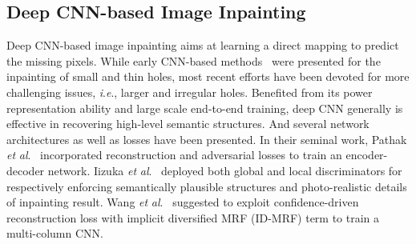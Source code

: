 \documentclass[10pt,journal,compsoc]{IEEEtran}
\newcommand{\ie}{\textit{i}.\textit{e}.}
\newcommand{\etal}{\textit{et} \textit{al}.}
\begin{document}
%
%
%
%
%
%

%
\subsection{Deep CNN-based Image Inpainting}\label{section2.2}
%
Deep CNN-based image inpainting aims at learning a direct mapping to predict the missing pixels.
%
While early CNN-based methods~\cite{XieDenoiseCNN,KohlerSSHJR2014,RenShepardConv} were presented for the inpainting of small and thin holes, most recent efforts have been devoted for more challenging issues, \ie, larger and irregular holes.
%
Benefited from its power representation ability and large scale end-to-end training, deep CNN generally is effective in recovering high-level semantic structures.
%
And several network architectures as well as losses have been presented.
%
In their seminal work, Pathak \etal~\cite{pathakCVPR16context} incorporated reconstruction and adversarial losses to train an encoder-decoder network.
%
Iizuka \etal~\cite{IizukaGL} deployed both global and local discriminators for respectively enforcing semantically plausible structures and photo-realistic details of inpainting result.
%
Wang \etal~\cite{WangMulticolumn} suggested to exploit confidence-driven reconstruction loss with implicit diversified MRF (ID-MRF) term to train a multi-column CNN.
\end{document}
